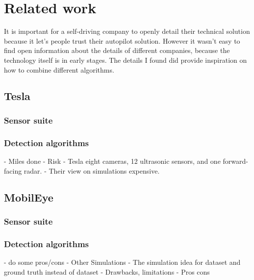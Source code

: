 \chapter{Related work}
\label{chap:relatedwork}

It is important for a self-driving company to openly detail their technical
solution because it let's people trust their autopilot solution. However it
wasn't easy to find open information about the details of different companies,
because the technology itself is in early stages. The details I found did
provide inspiration on how to combine different algorithms. 

\section{Tesla}

\subsection{Sensor suite}

\subsection{Detection algorithms}
- Miles done
- Risk
- Tesla  eight cameras, 12 ultrasonic sensors, and one forward-facing radar.
  - Their view on simulations
expensive.
\section{MobilEye}

\subsection{Sensor suite}

\subsection{Detection algorithms}

  -  do some pros/cons
- Other Simulations
- The simulation idea for dataset and ground truth instead of dataset
  - Drawbacks, limitations
  - Pros cons


